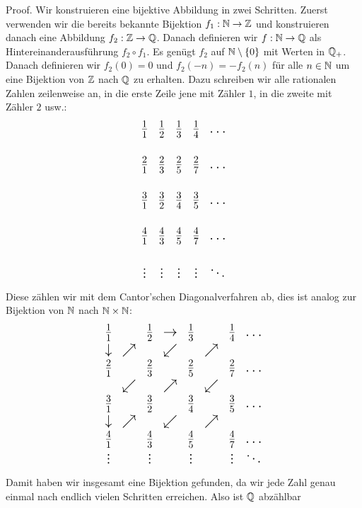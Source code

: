 \begin{emphBox}{}{}
Proof.  Wir konstruieren eine bijektive Abbildung in zwei Schritten. Zuerst verwenden wir die bereits bekannte Bijektion \(f_1 : \mathbb{N} \rightarrow \mathbb{Z}\) und konstruieren danach eine Abbildung \(f_2: \mathbb{Z} \rightarrow \mathbb{Q}\). Danach definieren wir \(f: \mathbb{N} \rightarrow \mathbb{Q}\) als Hintereinanderausführung \(f_2 \circ f_1\).
Es genügt \(f_2\) auf \(\mathbb{N} \setminus \{0\}\) mit Werten in \(\mathbb{Q}_+\). Danach definieren wir \(f_2(0)=0\) und \(f_2(-n)=-f_2(n)\) für alle \(n \in \mathbb{N}\) um eine Bijektion von \(\mathbb{Z}\) nach \(\mathbb{Q}\) zu erhalten. Dazu schreiben wir alle rationalen Zahlen zeilenweise an, in die erste Zeile jene mit Zähler \(1\), in die zweite mit Zähler \(2\) usw.:
\begin{equation*}
{\Large 
\begin{matrix}  
\frac{1}1 & \frac{1}2 & \frac{1}3 & \frac{1}4 & \ldots  \\
& & & &\\
\frac{2}1 & \frac{2}3 & \frac{2}5 & \frac{2}7 & \ldots \\
& & & &\\
\frac{3}1 & \frac{3}2 & \frac{3}4 & \frac{3}5 & \ldots \\
& & & &\\
\frac{4}1 & \frac{4}3 & \frac{4}5 & \frac{4}7 & \ldots \\
& & & &\\
\vdots & \vdots & \vdots & \vdots & \ddots
\end{matrix}}
\end{equation*}
Diese zählen wir mit dem Cantor’schen Diagonalverfahren ab, dies ist analog zur Bijektion von \(\mathbb{N}\) nach \(\mathbb{N} \times \mathbb{N}\):
\begin{equation*}
{\Large 
 \begin{matrix}    
\frac{1}1 & & \frac{1}2 & \rightarrow &\frac{1}3 & &\frac{1}4 & \ldots  \\
\downarrow & \nearrow & & \swarrow  & & \nearrow & & \\
\frac{2}1 & &\frac{2}3 & &\frac{2}5 & &\frac{2}7 & \ldots \\
& \swarrow & & \nearrow&&  \swarrow & & \\
\frac{3}1 & &\frac{3}2 & &\frac{3}4 & &\frac{3}5 & \ldots \\
\downarrow & \nearrow & & \swarrow  & & \nearrow & & \\
\frac{4}1 & &\frac{4}3 & &\frac{4}5 & &\frac{4}7 & \ldots \\
\vdots & &\vdots & &\vdots & & \vdots & \ddots
\end{matrix}}
\end{equation*}
Damit haben wir insgesamt eine Bijektion gefunden, da wir jede Zahl genau einmal nach endlich vielen Schritten erreichen. Also ist \(\mathbb{Q}\) abzählbar
\end{emphBox}


